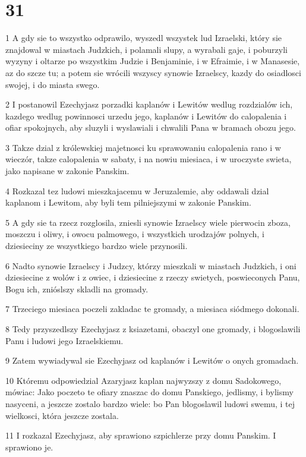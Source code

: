 \chapter{31}

\par 1 A gdy sie to wszystko odprawilo, wyszedl wszystek lud Izraelski, który sie znajdowal w miastach Judzkich, i polamali slupy, a wyrabali gaje, i poburzyli wyzyny i oltarze po wszystkim Judzie i Benjaminie, i w Efraimie, i w Manasesie, az do szcze tu; a potem sie wrócili wszyscy synowie Izraelscy, kazdy do osiadlosci swojej, i do miasta swego.
\par 2 I postanowil Ezechyjasz porzadki kaplanów i Lewitów wedlug rozdzialów ich, kazdego wedlug powinnosci urzedu jego, kaplanów i Lewitów do calopalenia i ofiar spokojnych, aby sluzyli i wyslawiali i chwalili Pana w bramach obozu jego.
\par 3 Takze dzial z królewskiej majetnosci ku sprawowaniu calopalenia rano i w wieczór, takze calopalenia w sabaty, i na nowiu miesiaca, i w uroczyste swieta, jako napisane w zakonie Panskim.
\par 4 Rozkazal tez ludowi mieszkajacemu w Jeruzalemie, aby oddawali dzial kaplanom i Lewitom, aby byli tem pilniejszymi w zakonie Panskim.
\par 5 A gdy sie ta rzecz rozglosila, zniesli synowie Izraelscy wiele pierwocin zboza, moszczu i oliwy, i owocu palmowego, i wszystkich urodzajów polnych, i dziesieciny ze wszystkiego bardzo wiele przynosili.
\par 6 Nadto synowie Izraelscy i Judzcy, którzy mieszkali w miastach Judzkich, i oni dziesiecine z wolów i z owiec, i dziesiecine z rzeczy swietych, poswieconych Panu, Bogu ich, znióslszy skladli na gromady.
\par 7 Trzeciego miesiaca poczeli zakladac te gromady, a miesiaca siódmego dokonali.
\par 8 Tedy przyszedlszy Ezechyjasz z ksiazetami, obaczyl one gromady, i blogoslawili Panu i ludowi jego Izraelskiemu.
\par 9 Zatem wywiadywal sie Ezechyjasz od kaplanów i Lewitów o onych gromadach.
\par 10 Któremu odpowiedzial Azaryjasz kaplan najwyzszy z domu Sadokowego, mówiac: Jako poczeto te ofiary znaszac do domu Panskiego, jedlismy, i bylismy nasyceni, a jeszcze zostalo bardzo wiele: bo Pan blogoslawil ludowi swemu, i tej wielkosci, która jeszcze zostala.
\par 11 I rozkazal Ezechyjasz, aby sprawiono szpichlerze przy domu Panskim. I sprawiono je.
